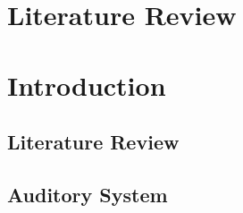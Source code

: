 \documentclass[10pt,a4paper,twoside,openright]{book}
\begin{document}
		{%
			\singlespacing%
			\tableofcontents%
			\listoffigures%
			\listoftables
                        \printglossaries
		   \clearpage%
		}%

\setcounter{chapter}{0}
\chapter{Literature Review}

\medskip{}





\chapter{Introduction}\label{Ch1:introduction}




\graphicspath{{../../figures/}{./gfx/}{/media/data/Work/thesis/SimpleResponsesChapter/}{/media/data/Work/thesis/SimpleResponsesChapter/gfx/}{/media/data/Work/cnstellate/}{/media/data/Work/cnstellate/golgi/}{/media/data/Work/cnstellate/}{/media/data/Work/cnstellate/TV_Notch/}}



\section{Literature Review}\label{Ch1:litreview}

\section{Auditory System}\label{Ch1:AuditorySystem}


\end{document}
